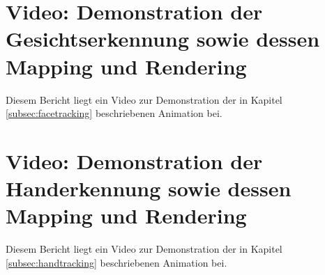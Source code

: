 \documentclass[a4paper, 12pt]{article}
\begin{document}
\clearpage
\printbibliography[heading=bibintoc]

\clearpage
\appendix
\section{Video: Demonstration der Gesichtserkennung sowie dessen Mapping und Rendering}
\label{sec:appendix-video-facetracking}
Diesem Bericht liegt ein Video zur Demonstration der in Kapitel \ref{subsec:facetracking} beschriebenen Animation bei.

\section{Video: Demonstration der Handerkennung sowie dessen Mapping und Rendering}
\label{sec:appendix-video-handtracking}
Diesem Bericht liegt ein Video zur Demonstration der in Kapitel \ref{subsec:handtracking} beschriebenen Animation bei.
\end{document}
